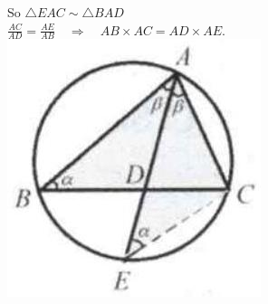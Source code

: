 \documentclass[10pt]{article}
\begin{document}
So \(\triangle E A C \sim \triangle B A D\)\\
\(\frac{A C}{A D}=\frac{A E}{A B} \quad \Rightarrow \quad A B \times A C=A D \times A E\).\\
\includegraphics[max width=\textwidth, center]{2025_04_17_97bc1f7e44d93c271a88g-165}
\end{document}
